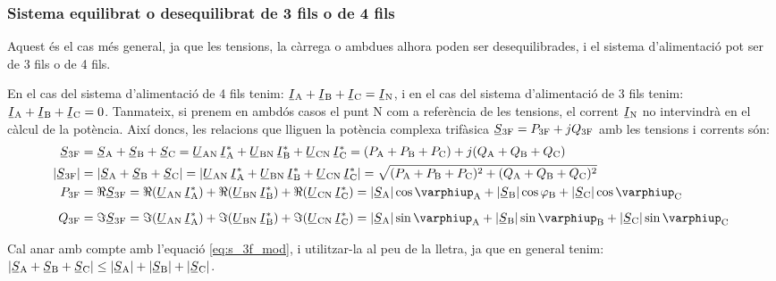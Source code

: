 \subsubsection{Sistema equilibrat o desequilibrat de 3 fils o de 4 fils}

Aquest és el cas més general, ja que les tensions, la càrrega o
ambdues alhora  poden ser desequilibrades, i el sistema
d'alimentació pot ser de 3 fils o de 4 fils.

En el cas del sistema d'alimentació de 4 fils tenim:
$\cmplx{I}\ped{A}+\cmplx{I}\ped{B}+\cmplx{I}\ped{C}=\cmplx{I}\ped{N}$, i
en el cas del sistema d'alimentació de 3 fils tenim:
$\cmplx{I}\ped{A}+\cmplx{I}\ped{B}+\cmplx{I}\ped{C}=0$. Tanmateix,
si prenem en ambdós casos el punt N com a referència de les
tensions, el corrent $\cmplx{I}\ped{N}$ no intervindrà en el càlcul de
la potència. Així doncs, les relacions que lliguen la potència
complexa trifàsica $\cmplx{S}\ped{3F} = P\ped{3F} + j Q\ped{3F}$
amb les tensions i corrents són:
\begin{align}
    \cmplx{S}\ped{3F} &= \cmplx{S}\ped{A} + \cmplx{S}\ped{B} + \cmplx{S}\ped{C} =
     \cmplx{U}\ped{AN}\, \cmplx{I}\ped{A}^* +
    \cmplx{U}\ped{BN} \,\cmplx{I}\ped{B}^* +  \cmplx{U}\ped{CN}\, \cmplx{I}\ped{C}^* =
    (P\ped{A} + P\ped{B} + P\ped{C}) + j (Q\ped{A} + Q\ped{B} + Q\ped{C}) \label{eq:s_3f} \\
    |\cmplx{S}\ped{3F}| &= |\cmplx{S}\ped{A} + \cmplx{S}\ped{B} + \cmplx{S}\ped{C}| =
    |\cmplx{U}\ped{AN}\, \cmplx{I}\ped{A}^* +
    \cmplx{U}\ped{BN} \,\cmplx{I}\ped{B}^* +  \cmplx{U}\ped{CN}\, \cmplx{I}\ped{C}^*| =
    \sqrt{(P\ped{A} + P\ped{B} + P\ped{C})^2 + (Q\ped{A} + Q\ped{B} + Q\ped{C})^2} \label{eq:s_3f_mod} \\
    P\ped{3F} &= \Re\cmplx{S}\ped{3F} = \Re(\cmplx{U}\ped{AN} \,\cmplx{I}\ped{A}^*) +
    \Re(\cmplx{U}\ped{BN} \,\cmplx{I}\ped{B}^*) +  \Re(\cmplx{U}\ped{CN}\,
    \cmplx{I}\ped{C}^*) = |\cmplx{S}\ped{A}| \cos \varphiup\ped{A} + |\cmplx{S}\ped{B}| \cos
    \varphi\ped{B} + |\cmplx{S}\ped{C}| \cos \varphiup\ped{C} \\[2mm]
    Q\ped{3F} &= \Im\cmplx{S}\ped{3F} = \Im(\cmplx{U}\ped{AN} \,\cmplx{I}\ped{A}^*) +
    \Im(\cmplx{U}\ped{BN} \,\cmplx{I}\ped{B}^*) +  \Im(\cmplx{U}\ped{CN}\,
    \cmplx{I}\ped{C}^*) = |\cmplx{S}\ped{A}| \sin \varphiup\ped{A} + |\cmplx{S}\ped{B}| \sin
    \varphiup\ped{B} + |\cmplx{S}\ped{C}| \sin \varphiup\ped{C}
\end{align}

Cal anar amb compte amb l'equació \eqref{eq:s_3f_mod}, i utilitzar-la al
peu de la lletra, ja
que en general tenim: $|\cmplx{S}\ped{A} + \cmplx{S}\ped{B} + \cmplx{S}\ped{C}| \leq
|\cmplx{S}\ped{A}| + |\cmplx{S}\ped{B}| + |\cmplx{S}\ped{C}|$.

